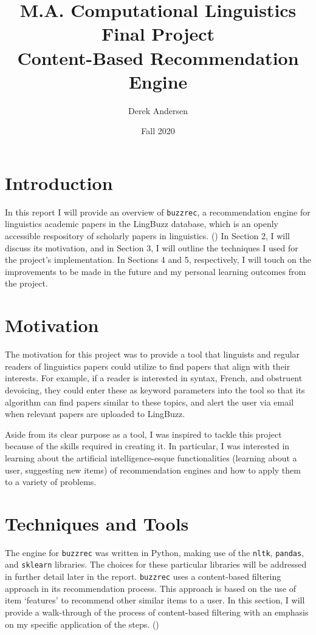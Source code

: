 \documentclass{article}
\title{\textbf{M.A. Computational Linguistics Final Project}\\Content-Based Recommendation Engine}
\author{Derek Andersen}
\date{Fall 2020}
\begin{document}
\maketitle

\section{Introduction}

In this report I will provide an overview of \texttt{buzzrec}, a recommendation engine for linguistics academic papers in the LingBuzz database, which is an openly accessible respository of scholarly papers in linguistics. (\cite{lingbuzz}) In Section 2, I will discuss its motivation, and in Section 3, I will outline the techniques I used for the project's implementation. In Sections 4 and 5, respectively, I will touch on the improvements to be made in the future and my personal learning outcomes from the project.

\section{Motivation}

The motivation for this project was to provide a tool that linguists and regular readers of linguistics papers could utilize to find papers that align with their interests. For example, if a reader is interested in syntax, French, and obstruent devoicing, they could enter these as keyword parameters into the tool so that its algorithm can find papers similar to these topics, and alert the user via email when relevant papers are uploaded to LingBuzz.  

Aside from its clear purpose as a tool, I was inspired to tackle this project because of the skills required in creating it. In particular, I was interested in learning about the artificial intelligence-esque functionalities (learning about a user, suggesting new items) of recommendation engines and how to apply them to a variety of problems. 


\section{Techniques and Tools}

The engine for \texttt{buzzrec} was written in Python, making use of the \texttt{nltk}, \texttt{pandas}, and \texttt{sklearn} libraries. The choices for these particular libraries will be addressed in further detail later in the report. \texttt{buzzrec} uses a content-based filtering approach in its recommendation process. This approach is based on the use of item `features' to recommend other similar items to a user. In this section, I will provide a walk-through of the process of content-based filtering with an emphasis on my specific application of the steps. (\cite{google}) \\
\end{document}
